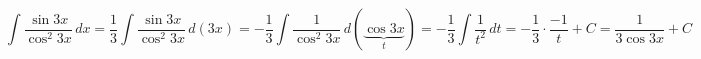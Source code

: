 \documentclass[../rgr1.tex]{subfiles}
\begin{document}
\Solution

\begin{dmath}
	\int \frac{\sin 3x}{\cos^2 3x} \, dx =
	\frac{1}{3} \int \frac{\sin 3x}{\cos^2 3x} \, d(3x) =
	- \frac{1}{3} \int \frac{1}{\cos^2 3x} \, d( \underbrace{\cos3x}_t ) =
	- \frac{1}{3} \int \frac{1}{t^2} \, dt =
	- \frac{1}{3} \cdot \frac{-1}{t} + C =
	\frac{1}{3\cos3x} + C
\end{dmath}

\end{document}
